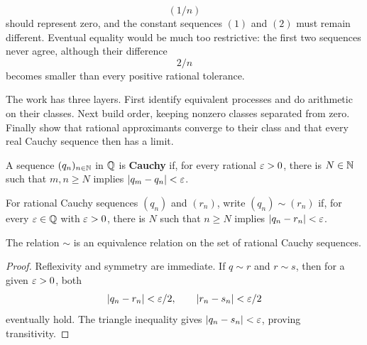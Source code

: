 \[
(1/n)
\]
 should represent zero, and the constant sequences $(1)$ and $(2)$
must remain different. Eventual equality would be much too restrictive:
the first two sequences never agree, although their difference
\[
2/n
\]
 becomes
smaller than every positive rational tolerance.

The work has three layers. First identify equivalent processes and do
arithmetic on their classes. Next build order, keeping nonzero classes
separated from zero. Finally show that rational approximants converge to
their class and that every real Cauchy sequence then has a limit.

\begin{definition}
\label{def:rational-cauchy}
A sequence $(q_n)_{n\in\mathbb{N}}$ in $\mathbb{Q}$ is \textbf{Cauchy} if, for every rational $\varepsilon>0$, there is $N\in\mathbb{N}$ such that $m,n\geq N$ implies $\lvert q_m-q_n\rvert<\varepsilon$.
\end{definition}

\begin{definition}
For rational Cauchy sequences $(q_n)$ and $(r_n)$, write $(q_n)\sim(r_n)$ if, for every $\varepsilon\in\mathbb{Q}$ with $\varepsilon>0$, there is $N$ such that $n\geq N$ implies $\lvert q_n-r_n\rvert<\varepsilon$.
\end{definition}

\begin{lemma}
\label{lem:null-equivalence}
The relation $\sim$ is an equivalence relation on the set of rational Cauchy sequences.
\end{lemma}
\begin{proof}
Reflexivity and symmetry are immediate. If $q\sim r$ and $r\sim s$, then for a given $\varepsilon>0$, both
\[
\lvert q_n-r_n\rvert<\varepsilon/2,\qquad \lvert r_n-s_n\rvert<\varepsilon/2
\]
 eventually hold. The triangle inequality gives $\lvert q_n-s_n\rvert<\varepsilon$, proving transitivity.
\end{proof}

